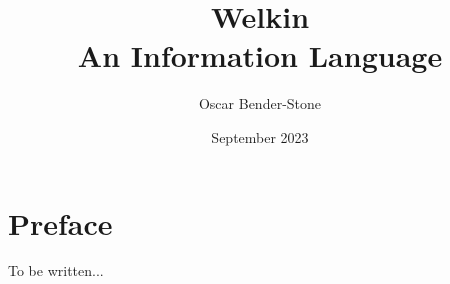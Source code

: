 \documentclass[leqno]{book}
\title{Welkin \\
  An Information Language}
\author{Oscar Bender-Stone}
\date{September 2023}
\begin{document}
\maketitle


\chapter*{Preface}

To be written...

\mainmatter






\end{document}
